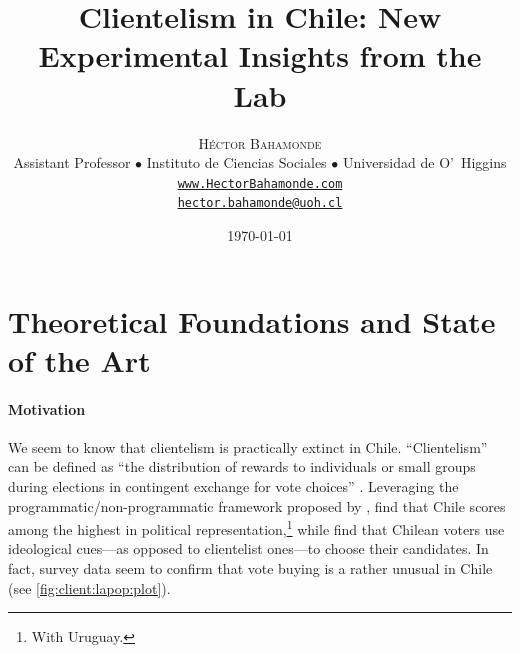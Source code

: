 \documentclass[onesided]{article}\usepackage[]{graphicx}\usepackage[]{color}
\title{Clientelism in Chile: New Experimental Insights from the Lab} %
\author[1]{
\large
\textsc{H\'ector Bahamonde}\\ 
\normalsize Assistant Professor $\bullet$ Instituto de Ciencias Sociales $\bullet$ Universidad de O'\ \unskip Higgins\\
\normalsize \href{http://www.hectorbahamonde.com}{\texttt{www.HectorBahamonde.com}}\\
\normalsize \href{mailto:hector.bahamonde@uoh.cl}{\texttt{hector.bahamonde@uoh.cl}}
\vspace{-5mm}
}
\date{\today}
\begin{document}
\maketitle %


\linespread{1}



















\section{Theoretical Foundations and State of the Art}

% 
\paragraph{Motivation} We seem to know that clientelism is practically extinct in Chile. ``Clientelism'' can be defined as ``the distribution of rewards to individuals or small groups during elections in contingent exchange for vote choices'' \parencite[316]{Nichter2014}. Leveraging the programmatic/non-programmatic framework proposed by \textcite{Kitschelt2000}, \textcite[413]{Luna2005} find that Chile scores among the highest in political representation,\footnote{With Uruguay.} while \textcite[874]{Calvo2013} find that Chilean voters use ideological cues---as opposed to clientelist ones---to choose their candidates. In fact, survey data seem to confirm that vote buying is a rather unusual in Chile (see \autoref{fig:client:lapop:plot}).%
\end{document}
